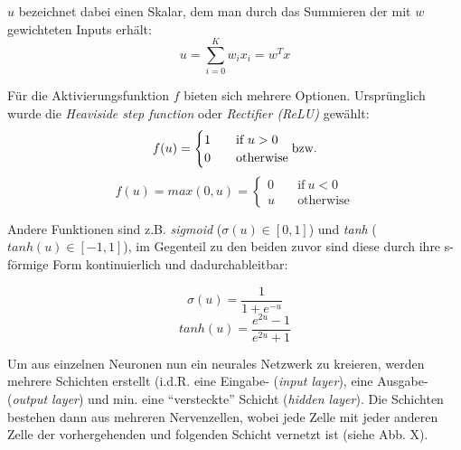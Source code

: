 $u$ bezeichnet dabei einen Skalar, dem man durch das Summieren der mit $w$ gewichteten Inputs erhält:
\begin{equation}
  u = \sum_{i=0}^{K} w_i x_i = w^T x
\end{equation}

Für die Aktivierungsfunktion $f$ bieten sich mehrere Optionen. Ursprünglich wurde die \emph{Heaviside step function}
oder \emph{Rectifier (ReLU)} gewählt:
\begin{equation}
    f(u) = \begin{cases} 1 & \quad \text{if}\ u > 0 \\ 0 & \quad \text{otherwise} \\ \end{cases} \text{bzw.} \\
\end{equation}
\begin{equation}
  f(u) = max(0,u) = \begin{cases} 0 & \quad \text{if}\ u < 0 \\ u & \quad \text{otherwise} \end{cases}
\end{equation}

Andere Funktionen sind z.B. \emph{sigmoid} ($\sigma(u) \in [0,1]$)
und \emph{tanh} ($tanh(u) \in [-1, 1]$), im Gegenteil zu den beiden zuvor sind diese durch ihre s-förmige Form
kontinuierlich und dadurchableitbar:

\begin{equation}
  \sigma(u) = \frac{1}{1 + e^{-u}}
\end{equation}
\begin{equation}
  tanh(u) = \frac{e^{2u}-1}{e^{2u}+1}
\end{equation}

Um aus einzelnen Neuronen nun ein neurales Netzwerk zu kreieren, werden mehrere Schichten erstellt (i.d.R. eine Eingabe-
(\emph{input layer}), eine Ausgabe- (\emph{output layer}) und min. eine ``versteckte'' Schicht (\emph{hidden layer}).
Die Schichten bestehen dann aus mehreren Nervenzellen, wobei jede Zelle mit jeder anderen Zelle der vorhergehenden und
folgenden Schicht vernetzt ist (siehe Abb. X).

